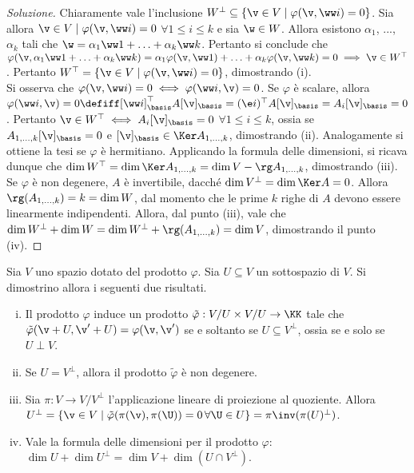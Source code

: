 \documentclass[11pt]{article}
\begin{document}
	\begin{proof}[Soluzione]
		Chiaramente vale l'inclusione $W^\perp \subseteq \{ \v \in V \mid \varphi(\v, \ww i) = 0 \}$. Sia
		allora $\v \in V \mid \varphi(\v, \ww i) = 0$ $\forall 1 \leq i \leq k$ e sia $\w \in W$. Allora esistono $\alpha_1$, ..., $\alpha_k$ tali
		che $\w = \alpha_1 \ww 1 + \ldots + \alpha_k \ww k$. Pertanto si conclude che $\varphi(\v, \alpha_1 \ww 1 + \ldots + \alpha_k \ww k) = \alpha_1 \varphi(\v, \ww 1) + \ldots + \alpha_k \varphi(\v, \ww k) = 0 \implies \v \in W^\top$. Pertanto $W^\top = \{ \v \in V \mid \varphi(\v, \ww i) = 0 \}$, dimostrando (i). \\
		
		Si osserva che $\varphi(\v, \ww i) = 0 \iff \varphi(\ww i, \v) = 0$. Se $\varphi$ è scalare, allora
		$\varphi(\ww i, \v) = 0 \defiff [\ww i]_\basis^\top A [\v]_\basis = (\e i)^\top A [\v]_\basis = A_i [\v]_\basis = 0$. Pertanto $\v \in W^\top \iff A_i [\v]_\basis = 0$ $\forall 1 \leq i \leq k$, ossia se
		$A_{1, \ldots, k} [\v]_\basis = 0$ e $[\v]_\basis \in \Ker A_{1, \ldots, k}$, dimostrando (ii). Analogamente
		si ottiene la tesi se $\varphi$ è hermitiano.
		Applicando la formula delle dimensioni, si ricava dunque che $\dim W^\top = \dim \Ker A_{1, \ldots, k} =
		\dim V - \rg A_{1, \ldots, k}$, dimostrando (iii). \\
		
		Se $\varphi$ è non degenere, $A$ è invertibile, dacché $\dim V^\perp = \dim \Ker A = 0$. Allora
		$\rg(A_{1,\ldots,k}) = k = \dim W$, dal momento che le prime $k$ righe di $A$ devono essere linearmente indipendenti. Allora, dal punto (iii), vale che $\dim W^\perp + \dim W = \dim W^\perp + \rg(A_{1,\ldots,k}) = \dim V$, dimostrando il punto (iv).
	\end{proof}
	
	\begin{exercise}
		Sia $V$ uno spazio dotato del prodotto $\varphi$. Sia
		$U \subseteq V$ un sottospazio di $V$. Si dimostrino allora i seguenti due
		risultati.
		
		\begin{enumerate}[(i)]
			\item Il prodotto $\varphi$
			induce un prodotto $\tilde \varphi : V/U \times V/U \to \KK$ tale che
			$\tilde \varphi(\v + U, \v' + U) = \varphi(\v, \v')$ se e soltanto se $U \subseteq V^\perp$, ossia
			se e solo se $U \perp V$.
			
			\item Se $U = V^\perp$, allora il prodotto $\tilde \varphi$ è non degenere.
			
			\item Sia $\pi : V \to V/V^\perp$ l'applicazione lineare di proiezione al quoziente. Allora
			$U^\perp = \{ \v \in V \mid \tilde \varphi(\pi(\v), \pi(\U)) = 0 \, \forall \U \in U \} = \pi\inv(\pi(U)^\perp)$.
			
			\item Vale la formula delle dimensioni per il prodotto $\varphi$: $\dim U + \dim U^\perp = \dim V + \dim (U \cap V^\perp)$.   
		\end{enumerate}
	\end{exercise}
	
\end{document}
